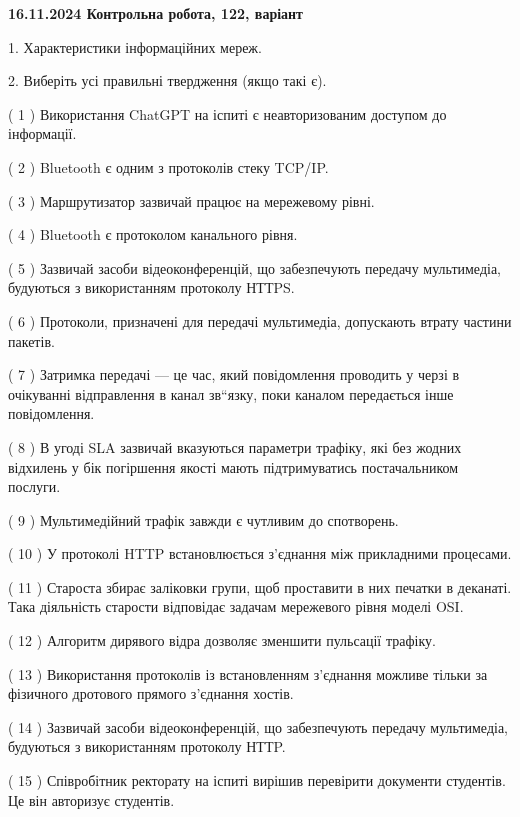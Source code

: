 \documentclass[12pt, ukrainian]{article}
\begin{document}
\vspace{4mm}
\newpage
\begin {large}

\textbf{16.11.2024 Контрольна робота, 122, варіант  }\par


{
1. Характеристики інформаційних мереж.



\vspace{5mm}
2. Виберіть усі правильні твердження (якщо такі є).\par
\vspace{2mm}

( 1 ) Використання ChatGPT на іспиті є неавторизованим доступом до інформації.

( 2 ) Bluetooth є одним з протоколів стеку TCP/IP.

( 3 ) Маршрутизатор зазвичай працює на мережевому рівні.

( 4 ) Bluetooth є протоколом канального рівня.

( 5 ) Зазвичай засоби відеоконференцій, що забезпечують передачу мультимедіа, будуються з використанням протоколу НТТPS.

( 6 ) Протоколи, призначені для передачі мультимедіа, допускають втрату частини пакетів.

( 7 ) Затримка передачі — це час, який повідомлення проводить у черзі в очікуванні відправлення в канал зв“язку, поки каналом передається інше повідомлення.

( 8 ) В угоді SLA зазвичай вказуються параметри трафіку, які без жодних відхилень у бік погіршення якості мають підтримуватись постачальником послуги.

( 9 ) Мультимедійний трафік завжди є чутливим до спотворень.

( 10 ) У протоколі HTTP встановлюється з'єднання між прикладними процесами.

( 11 ) Староста збирає заліковки групи, щоб проставити в них печатки в деканаті. Така діяльність старости відповідає задачам мережевого рівня моделі OSI.

( 12 ) Алгоритм дирявого відра дозволяє зменшити пульсації трафіку.

( 13 ) Використання протоколів із встановленням з'єднання можливе тільки за фізичного дротового прямого з'єднання хостів.

( 14 ) Зазвичай засоби відеоконференцій, що забезпечують передачу мультимедіа, будуються з використанням протоколу НТТP.

( 15 ) Співробітник ректорату на іспиті вирішив перевірити документи студентів. Це він авторизує студентів.
}
\end {large}
\end{document}

